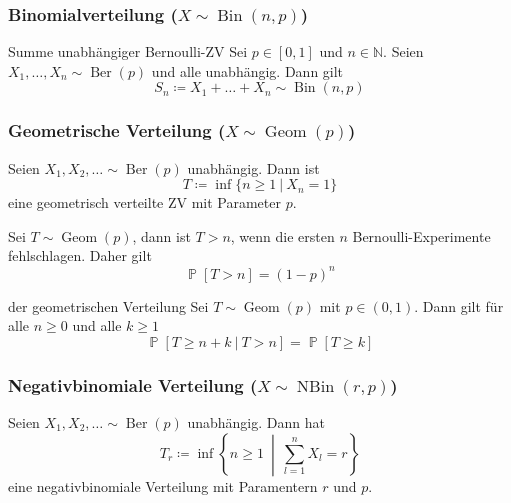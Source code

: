 \documentclass[a4paper,10pt]{article}
\def\N{\mathbb{N}}
\renewcommand{\P}{\operatorname{\mathbb{P}}}
\DeclareMathOperator{\Ber}{Ber}
\DeclareMathOperator{\Bin}{Bin}
\DeclareMathOperator{\Geom}{Geom}
\DeclareMathOperator{\NBin}{NBin}
\numberwithin{equation}{section}
\begin{document}
\subsubsection{Binomialverteilung (\( X \sim \Bin(n, p) \))}

\begin{subbox}{Summe unabhängiger Bernoulli-ZV}
    Sei \( p \in [0, 1] \) und \( n \in \N \). Seien \( X_1, \dots, X_n \sim \Ber(p) \) und alle unabhängig. Dann gilt
    \[
        S_n \coloneqq X_1 + \dots + X_n \sim \Bin(n, p)
    \]
\end{subbox}

\subsubsection{Geometrische Verteilung (\( X \sim \Geom(p) \))}

\begin{subbox}{}
    Seien \( X_1, X_2, \dots \sim \Ber(p) \) unabhängig. Dann ist
    \[
        T \coloneqq \inf\{n \geq 1 \: | \: X_n = 1 \}
    \]
    eine geometrisch verteilte ZV mit Parameter \( p \).
\end{subbox}

Sei \( T \sim \Geom(p) \), dann ist \( T > n \), wenn die ersten \( n \) Bernoulli-Experimente fehlschlagen. Daher gilt
\[
    \P[T > n] = (1 - p)^n
\]

\begin{subbox}{ der geometrischen Verteilung}
    Sei \( T \sim \Geom(p) \) mit \( p \in (0, 1) \). Dann gilt für alle \( n \geq 0 \) und alle \( k \geq 1 \)
    \[
        \P[T \geq n + k \: | \: T > n] = \P[T \geq k]
    \]
\end{subbox}

\subsubsection{Negativbinomiale Verteilung (\( X \sim \NBin(r, p) \))}

\begin{subbox}{}
    Seien \( X_1, X_2, \dots \sim \Ber(p) \) unabhängig. Dann hat
    \[
        T_r \coloneqq \inf\left\{ n \geq 1 \: \middle| \: \sum_{l = 1}^n X_l = r \right\}
    \]
    eine negativbinomiale Verteilung mit Paramentern \( r \) und \( p \).
\end{subbox}
\end{document}
